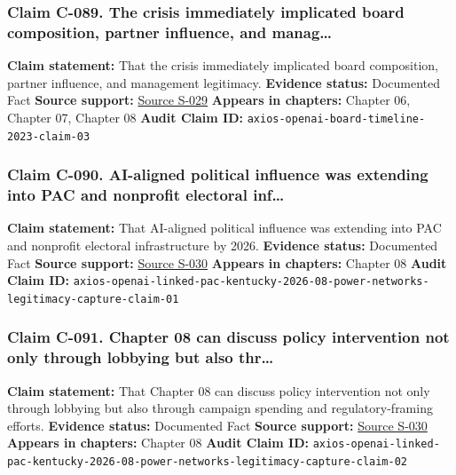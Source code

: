 \documentclass[
  american,
  11pt,
  letterpaper,
]{article}
\begin{document}
\subsubsection{Claim C-089. The crisis immediately implicated board
composition, partner influence, and
manag\ldots{}}\label{claim-c-089-the-crisis-immediately-implicated-board-composition-partner-influence-and-manag}

\textbf{Claim statement:} That the crisis immediately implicated board
composition, partner influence, and management legitimacy.
\textbf{Evidence status:} Documented Fact \textbf{Source support:}
\hyperref[source-s-029-how-sam-altman-s-ouster-went-down-according-to-openai-s-ex-president]{Source
S-029} \textbf{Appears in chapters:} Chapter 06, Chapter 07, Chapter 08
\textbf{Audit Claim ID:}
\texttt{axios-openai-board-timeline-2023-claim-03}

\subsubsection{Claim C-090. AI-aligned political influence was extending
into PAC and nonprofit electoral
inf\ldots{}}\label{claim-c-090-ai-aligned-political-influence-was-extending-into-pac-and-nonprofit-electoral-inf}

\textbf{Claim statement:} That AI-aligned political influence was
extending into PAC and nonprofit electoral infrastructure by 2026.
\textbf{Evidence status:} Documented Fact \textbf{Source support:}
\hyperref[source-s-030-openai-linked-pac-doubles-down-in-kentucky]{Source
S-030} \textbf{Appears in chapters:} Chapter 08 \textbf{Audit Claim ID:}
\texttt{axios-openai-linked-pac-kentucky-2026-08-power-networks-legitimacy-capture-claim-01}

\subsubsection{Claim C-091. Chapter 08 can discuss policy intervention
not only through lobbying but also
thr\ldots{}}\label{claim-c-091-chapter-08-can-discuss-policy-intervention-not-only-through-lobbying-but-also-thr}

\textbf{Claim statement:} That Chapter 08 can discuss policy
intervention not only through lobbying but also through campaign
spending and regulatory-framing efforts. \textbf{Evidence status:}
Documented Fact \textbf{Source support:}
\hyperref[source-s-030-openai-linked-pac-doubles-down-in-kentucky]{Source
S-030} \textbf{Appears in chapters:} Chapter 08 \textbf{Audit Claim ID:}
\texttt{axios-openai-linked-pac-kentucky-2026-08-power-networks-legitimacy-capture-claim-02}
\end{document}
